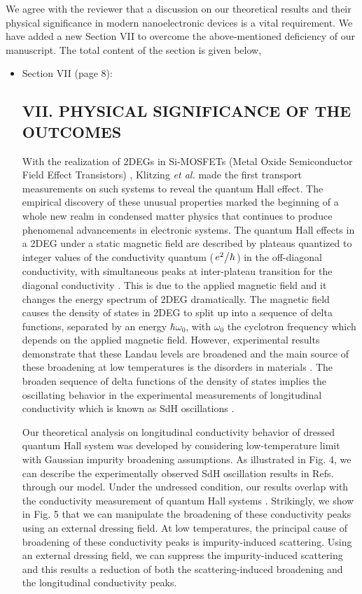 \documentclass{article}
\begin{document}
We agree with the reviewer that a discussion on our theoretical results and their physical significance in modern nanoelectronic devices is a vital requirement. We have added a new Section VII to overcome the above-mentioned deficiency of our manuscript. The total content of the section is given below,

\begin{itemize}
  \item Section VII (page 8):\\
  {\color{Red}
  \subsection*{VII. PHYSICAL SIGNIFICANCE OF THE OUTCOMES}

  With the realization of 2DEGs in Si-MOSFETs (Metal Oxide Semiconductor Field Effect Transistors) \citep{fowler66}, Klitzing \textit{et al.} \cite{klitzing80} made the first transport measurements on such systems to reveal the quantum Hall effect. The empirical discovery of these unusual properties marked the beginning of a whole new realm in condensed matter physics that continues to produce phenomenal advancements in electronic systems. The quantum Hall effects in a 2DEG under a static magnetic field are described by plateaus quantized to integer values of the conductivity quantum ($\flatfrac{e^2}{\hbar}$) in the off-diagonal conductivity, with simultaneous peaks at inter-plateau transition for the diagonal conductivity \cite{endo09}. This is due to the applied magnetic field and it changes the energy spectrum of 2DEG dramatically. The magnetic field causes the density of states in 2DEG to split up into a sequence of delta functions, separated by an energy $\hbar\omega_0$, with $\omega_0$ the cyclotron frequency which depends on the applied magnetic field.
  However, experimental results demonstrate that these Landau levels are broadened and the main source of these broadening at low temperatures is the disorders in materials \cite{ando85,dial07}. The broaden sequence of delta functions of the density of states implies the oscillating behavior in the experimental measurements of longitudinal conductivity which is known as SdH oscillations \cite{endo09,wakabayashi78}.

  Our theoretical analysis on longitudinal conductivity behavior of dressed quantum Hall system was developed by considering low-temperature limit with Gaussian impurity broadening assumptions.
  As illustrated in Fig. 4, we can describe the experimentally observed SdH oscillation results in Refs.\cite{endo09,wakabayashi78} through our model.
  Under the undressed condition, our results overlap with the conductivity measurement of quantum Hall systems \cite{endo09}. Strikingly, we show in Fig. 5 that we can manipulate the broadening of these conductivity peaks using an external dressing field. At low temperatures, the principal cause of broadening of these conductivity peaks is impurity-induced scattering. Using an external dressing field, we can suppress the impurity-induced scattering and this results a reduction of both the scattering-induced broadening and the longitudinal conductivity peaks.

}
\end{itemize}
\end{document}
